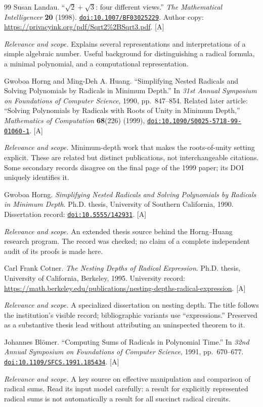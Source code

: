 \documentclass[11pt,letterpaper]{article}
\numberwithin{equation}{section}
\theoremstyle{definition}
\theoremstyle{remark}
\newcommand{\doi}[1]{\href{https://doi.org/#1}{\nolinkurl{doi:#1}}}
\newcommand{\status}[1]{\textsf{\small[#1]}}
\newcommand{\entrynote}[1]{\par\smallskip\noindent\emph{Relevance and scope.} #1}
\begin{document}
\begin{thebibliography}{99}
Susan Landau. ``$\sqrt{2}+\sqrt{3}$: four different views.'' \emph{The Mathematical Intelligencer} \textbf{20} (1998). \doi{10.1007/BF03025229}. Author copy: \url{https://privacyink.org/pdf/Sqrt2%2BSqrt3.pdf}. \status{A}
\entrynote{Explains several representations and interpretations of a simple algebraic number. Useful background for distinguishing a radical formula, a minimal polynomial, and a computational representation.}

Gwoboa Horng and Ming-Deh A. Huang. ``Simplifying Nested Radicals and Solving Polynomials by Radicals in Minimum Depth.'' In \emph{31st Annual Symposium on Foundations of Computer Science}, 1990, pp.~847--854. Related later article: ``Solving Polynomials by Radicals with Roots of Unity in Minimum Depth,'' \emph{Mathematics of Computation} \textbf{68}(226) (1999), \doi{10.1090/S0025-5718-99-01060-1}. \status{A}
\entrynote{Minimum-depth work that makes the roots-of-unity setting explicit. These are related but distinct publications, not interchangeable citations. Some secondary records disagree on the final page of the 1999 paper; its DOI uniquely identifies it.}

Gwoboa Horng. \emph{Simplifying Nested Radicals and Solving Polynomials by Radicals in Minimum Depth}. Ph.D. thesis, University of Southern California, 1990. Dissertation record: \doi{10.5555/142931}. \status{A}
\entrynote{An extended thesis source behind the Horng--Huang research program. The record was checked; no claim of a complete independent audit of its proofs is made here.}

Carl Frank Cotner. \emph{The Nesting Depths of Radical Expression}. Ph.D. thesis, University of California, Berkeley, 1995. University record: \url{https://math.berkeley.edu/publications/nesting-depths-radical-expression}. \status{A}
\entrynote{A specialized dissertation on nesting depth. The title follows the institution's visible record; bibliographic variants use ``expressions.'' Preserved as a substantive thesis lead without attributing an uninspected theorem to it.}

Johannes Bl\"omer. ``Computing Sums of Radicals in Polynomial Time.'' In \emph{32nd Annual Symposium on Foundations of Computer Science}, 1991, pp.~670--677. \doi{10.1109/SFCS.1991.185434}. \status{A}
\entrynote{A key source on effective manipulation and comparison of radical sums. Read its input model carefully: a result for explicitly represented radical sums is not automatically a result for all succinct radical circuits.}


\end{thebibliography}
\end{document}
